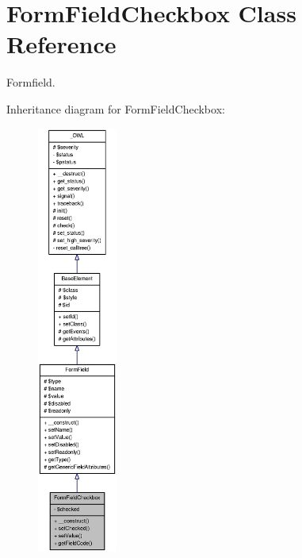 \section{FormFieldCheckbox Class Reference}
\label{classFormFieldCheckbox}


Formfield.  




Inheritance diagram for FormFieldCheckbox:\nopagebreak
\begin{figure}[H]
\begin{center}
\leavevmode
\includegraphics[height=400pt]{classFormFieldCheckbox__inherit__graph}
\end{center}
\end{figure}


